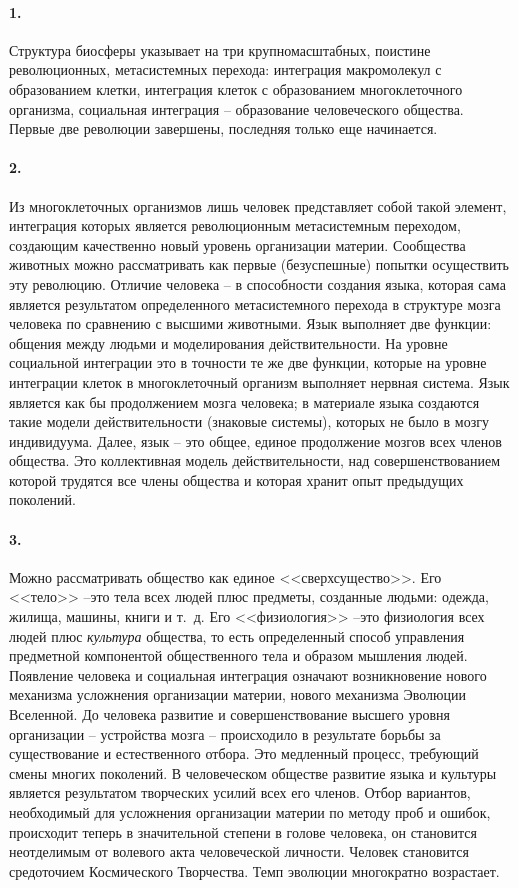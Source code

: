 \documentclass{book}
\begin{document}
\paragraph{1.} Структура биосферы указывает на три крупномасштабных, поистине революционных, метасистемных перехода: интеграция макромолекул с образованием клетки, интеграция клеток с образованием многоклеточного организма, социальная интеграция -- образование человеческого общества. Первые две революции завершены, последняя только еще начинается.

\paragraph{2.} Из многоклеточных организмов лишь человек представляет собой такой элемент, интеграция которых является революционным метасистемным переходом, создающим качественно новый уровень организации материи. Сообщества животных можно рассматривать как первые (безуспешные) попытки осуществить эту революцию. Отличие человека -- в способности создания языка, которая сама является результатом определенного метасистемного перехода в структуре мозга человека по сравнению с высшими животными. Язык выполняет две функции: общения между людьми и моделирования действительности. На уровне социальной интеграции это в точности те же две функции, которые на уровне интеграции клеток в многоклеточный организм выполняет нервная система. Язык является как бы продолжением мозга человека; в материале языка создаются такие модели действительности (знаковые системы), которых не было в мозгу индивидуума. Далее, язык -- это общее, единое продолжение мозгов всех членов общества. Это коллективная модель действительности, над 
совершенствованием которой трудятся все члены общества и которая хранит опыт предыдущих поколений.

\paragraph{3.} Можно рассматривать общество как единое <<сверхсущество>>. Его <<тело>> --это тела всех людей плюс предметы, созданные людьми: одежда, жилища, машины, книги и т.~д. Его <<физиология>> --это физиология всех людей плюс \textit{культура}  общества, то есть определенный способ управления предметной компонентой общественного тела и образом мышления людей. Появление человека и социальная интеграция означают возникновение нового механизма усложнения организации материи, нового механизма Эволюции Вселенной. До человека развитие и совершенствование высшего уровня организации -- устройства мозга -- происходило в результате борьбы за существование и естественного отбора. Это медленный процесс, требующий смены многих поколений. В человеческом обществе развитие языка и культуры является результатом творческих усилий всех его членов. Отбор вариантов, необходимый для усложнения организации материи по методу проб и ошибок, происходит теперь в значительной степени в голове человека, он становится неотделимым 
от 
волевого 
акта человеческой личности. Человек становится средоточием Космического Творчества. Темп эволюции многократно возрастает.
\end{document}
